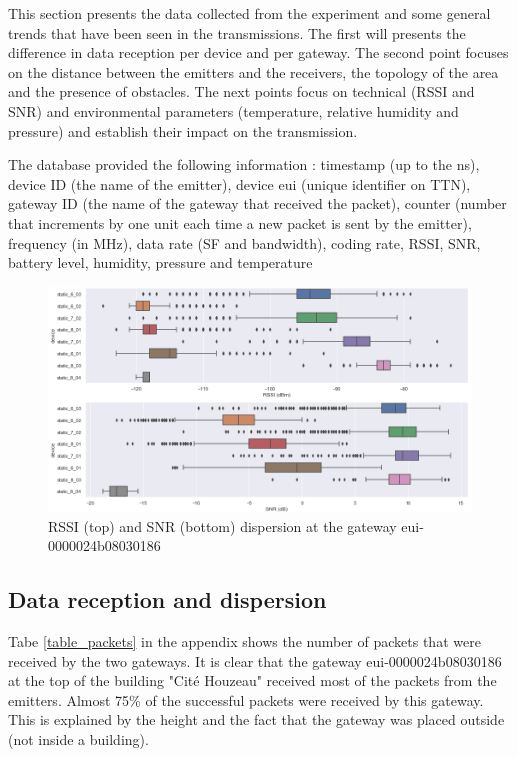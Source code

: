 \documentclass[letterpaper, 10 pt, conference]{ieeeconf}  %
\begin{document}
This section presents the data collected from the experiment and some general trends that have been seen in the transmissions. The first will presents the difference in data reception per device and per gateway. The second point focuses on the distance between the emitters and the receivers, the topology of the area and the presence of obstacles. The next points focus on technical (RSSI and SNR) and environmental parameters (temperature, relative humidity and pressure) and establish their impact on the transmission.

The database provided the following information : timestamp (up to the ns), device ID (the name of the emitter), device eui (unique identifier on TTN), gateway ID (the name of the gateway that received the packet), counter (number that increments by one unit each time a new packet is sent by the emitter), frequency (in MHz), data rate (SF and bandwidth), coding rate, RSSI, SNR, battery level, humidity, pressure and temperature

\begin{figure}[t]
\centering
\includegraphics[scale=0.48]{boxplot.png}
\caption{RSSI (top) and SNR (bottom) dispersion at the gateway eui-0000024b08030186 \cite{c2}}
\label{boxplot}
\end{figure}

\subsection{Data reception and dispersion}

Tabe \ref{table_packets} in the appendix shows the number of packets that were received by the two gateways. It is clear  that the gateway eui-0000024b08030186 at the top of the building "Cit\'e Houzeau" received most of the packets from the emitters. Almost 75\% of the successful packets were received by this gateway. This is explained by the height and the fact that the gateway was placed outside (not inside a building).
\end{document}
